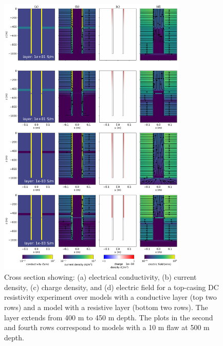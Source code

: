 \begin{figure}
    \begin{center}
    \includegraphics[width=0.8\textwidth]{figures/dc_casing/integrity_layer_physics.png}
    \end{center}
\caption{
    Cross section showing: (a) electrical conductivity, (b) current density, (c) charge density,
    and (d) electric field for a top-casing DC resistivity experiment over models with a conductive layer
    (top two rows) and a model with a resistive layer (bottom two rows). The layer extends from
    400 m to 450 m depth. The plots in the second and fourth rows correspond to models with a 10 m flaw at 500 m depth.
}
\label{fig:integrity_layer_physics}
\end{figure}
